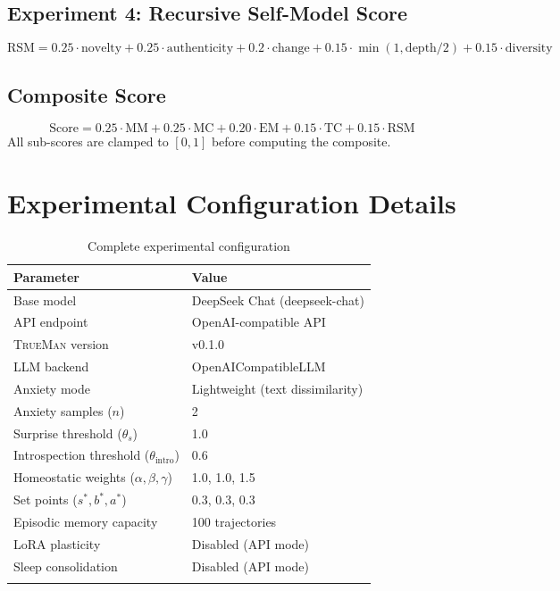\documentclass[pdflatex,sn-mathphys-num]{sn-jnl}
\newcommand{\TrueMan}{\textsc{TrueMan}}
\theoremstyle{thmstyleone}%
\theoremstyle{thmstyletwo}%
\theoremstyle{thmstylethree}%
\begin{document}
\begin{appendices}
\subsection{Experiment 4: Recursive Self-Model Score}

\begin{equation}
\text{RSM} = 0.25 \cdot \text{novelty} + 0.25 \cdot \text{authenticity} + 0.2 \cdot \text{change} + 0.15 \cdot \min(1, \text{depth}/2) + 0.15 \cdot \text{diversity}
\end{equation}

\subsection{Composite Score}

\begin{equation}
\text{Score} = 0.25 \cdot \text{MM} + 0.25 \cdot \text{MC} + 0.20 \cdot \text{EM} + 0.15 \cdot \text{TC} + 0.15 \cdot \text{RSM}
\end{equation}
All sub-scores are clamped to $[0,1]$ before computing the composite.

\section{Experimental Configuration Details}\label{secA2}

\begin{table}[h]
\caption{Complete experimental configuration}\label{tab:config}%
\begin{tabular}{@{}ll@{}}
\toprule
Parameter & Value \\
\midrule
Base model & DeepSeek Chat (deepseek-chat) \\
API endpoint & OpenAI-compatible API \\
\TrueMan{} version & v0.1.0 \\
LLM backend & OpenAICompatibleLLM \\
Anxiety mode & Lightweight (text dissimilarity) \\
Anxiety samples ($n$) & 2 \\
Surprise threshold ($\theta_s$) & 1.0 \\
Introspection threshold ($\theta_{\text{intro}}$) & 0.6 \\
Homeostatic weights ($\alpha, \beta, \gamma$) & 1.0, 1.0, 1.5 \\
Set points ($s^*, b^*, a^*$) & 0.3, 0.3, 0.3 \\
Episodic memory capacity & 100 trajectories \\
LoRA plasticity & Disabled (API mode) \\
Sleep consolidation & Disabled (API mode) \\
\botrule
\end{tabular}
\end{table}

\end{appendices}


\end{document}
